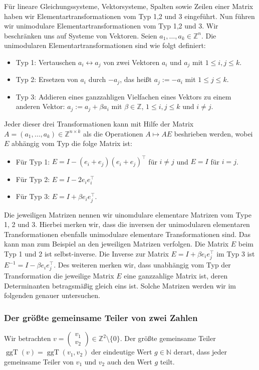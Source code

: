 \documentclass[
a4paper,landscape,16pt,
bibliography=totocnumbered,
numbers=noenddot,
]{scrartcl}
\numberwithin{equation}{subsection}
\newcommand{\N}{\mathbb N}
\newcommand{\Z}{\mathbb Z}
\newcommand{\ggT}{\operatorname{ggT}} %
\theoremstyle{plain}
\theoremstyle{definition}
\begin{document}
Für lineare Gleichungssysteme, Vektorsysteme, Spalten sowie Zeilen einer Matrix haben wir Elementartransformationen vom Typ 1,2 und 3 eingeführt. Nun führen wir unimodulare Elementartransformationen vom Typ 1,2 und 3. Wir beschränken uns auf Systeme von Vektoren. Seien $a_1,\ldots, a_k \in \Z^n$. Die unimodularen Elementartransformationen sind wie folgt definiert: 
\begin{itemize} 
	\item[] Typ 1: Vertauschen $a_i \leftrightarrow a_j$ von zwei Vektoren $a_i$ und $a_j$ mit $1 \le i, j \le k$. 
	\item[] Typ 2: Ersetzen von $a_i$ durch $- a_j$, das heißt $a_j := - a_i$ mit $1 \le j \le k$. 
	\item[] Typ 3: Addieren eines ganzzahligen Vielfachen eines Vektors zu einem anderen Vektor: $a_j := a_j + \beta a_i$ mit $\beta \in \Z$, $1 \le i,j \le k$ und $i \ne j$. 
\end{itemize} 
Jeder dieser drei Transformationen kann mit Hilfe der Matrix $A = (a_1,\ldots,a_k) \in \Z^{n \times k}$ als die Operationen $A \mapsto A E$ beshrieben werden, wobei $E$  abhängig vom Typ die folge Matrix ist: 
\begin{itemize} 
	\item[] Für Typ 1: $E = I - (e_i+e_j)(e_i+e_j)^\top$ für $i \ne j$ und $E = I$ für $i = j$. 
	\item[] Für Typ 2:  $E = I - 2 e_i e_i^\top$ 
	\item[] Für Typ 3: $E = I + \beta e_i e_j^\top$. 
\end{itemize} 
Die jeweiligen Matrizen nennen wir uinomdulare elementare Matrizen vom Type 1, 2 und 3. Hierbei merken wir, dass die inversen der unimodularen elementaren Transformationen ebenfalls unimodulare elementare Transformationen sind. Das kann man zum Beispiel an den jeweiligen Matrizen verfolgen. Die Matrix $E$ beim Typ 1 und 2 ist selbst-inverse. Die Inverse zur Matrix $E = I + \beta e_i e_j^\top$ im Typ 3 ist $E^{-1} = I - \beta e_i e_j^\top$. Des weiteren merken wir, dass unabhängig vom Typ der Transformation die jeweilige Matrix $E$ eine ganzzahlige Matrix ist, deren Determinanten betragsmäßig gleich eins ist. Solche Matrizen werden wir im folgenden genauer untersuchen. 

\subsubsection{Der größte gemeinsame Teiler von zwei Zahlen}

\label{ggT:zahlen} 
Wir betrachten $v = \begin{pmatrix} v_1 \\ v_2 \end{pmatrix} \in \Z^2 \setminus \{0\}$. Der größte gemeinsame Teiler $\ggT(v) = \ggT(v_1,v_2)$ der eindeutige Wert $g \in \N$ derart, dass jeder gemeinsame Teiler von $v_1$ und $v_2$ auch den Wert $g$ teilt. 
\end{document}
